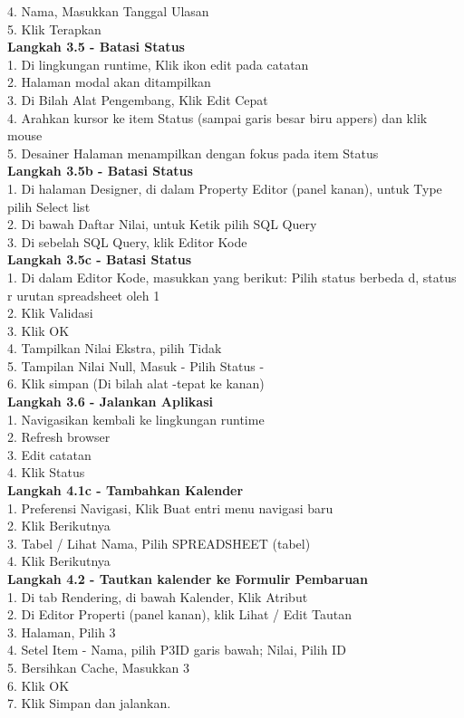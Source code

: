 \documentclass [12pt, times new roman, a4paper]{article}
\begin{document}
4. Nama, Masukkan Tanggal Ulasan \\
5. Klik Terapkan \\
\textbf{Langkah 3.5 - Batasi Status} \\
1. Di lingkungan runtime, Klik ikon edit pada catatan \\
2. Halaman modal akan ditampilkan \\
3. Di Bilah Alat Pengembang, Klik Edit Cepat \\
4. Arahkan kursor ke item Status (sampai garis besar biru appers) dan klik mouse \\
5. Desainer Halaman menampilkan dengan fokus pada item Status \\
\textbf{Langkah 3.5b - Batasi Status} \\
1. Di halaman Designer, di dalam Property Editor (panel kanan), untuk Type pilih Select list \\
2. Di bawah Daftar Nilai, untuk Ketik pilih SQL Query \\
3. Di sebelah SQL Query, klik Editor Kode \\
\textbf{Langkah 3.5c - Batasi Status} \\
1. Di dalam Editor Kode, masukkan yang berikut: Pilih status berbeda d, status r urutan spreadsheet oleh 1 \\
2. Klik Validasi \\
3. Klik OK \\
4. Tampilkan Nilai Ekstra, pilih Tidak \\
5. Tampilan Nilai Null, Masuk - Pilih Status - \\
6. Klik simpan (Di bilah alat -tepat ke kanan) \\
\textbf{Langkah 3.6 - Jalankan Aplikasi} \\
1. Navigasikan kembali ke lingkungan runtime \\
2. Refresh browser \\
3. Edit catatan \\
4. Klik Status \\
\textbf{Langkah 4.1c - Tambahkan Kalender} \\
1. Preferensi Navigasi, Klik Buat entri menu navigasi baru \\
2. Klik Berikutnya \\
3. Tabel / Lihat Nama, Pilih SPREADSHEET (tabel) \\
4. Klik Berikutnya \\
\textbf{Langkah 4.2 - Tautkan kalender ke Formulir Pembaruan} \\
1. Di tab Rendering, di bawah Kalender, Klik Atribut \\
2. Di Editor Properti (panel kanan), klik Lihat / Edit Tautan \\
3. Halaman, Pilih 3 \\
4. Setel Item - Nama, pilih P3\textunderscore ID garis bawah; Nilai, Pilih ID \\
5. Bersihkan Cache, Masukkan 3 \\
6. Klik OK \\
7. Klik Simpan dan jalankan.
\end{document}

